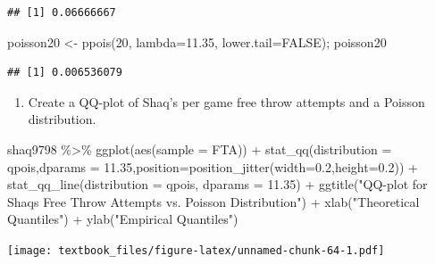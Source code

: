 \documentclass[
  11pt,
]{book}
\newenvironment{Shaded}{\begin{snugshade}}{\end{snugshade}}
\newcommand{\AttributeTok}[1]{\textcolor[rgb]{0.77,0.63,0.00}{#1}}
\newcommand{\ConstantTok}[1]{\textcolor[rgb]{0.00,0.00,0.00}{#1}}
\newcommand{\DecValTok}[1]{\textcolor[rgb]{0.00,0.00,0.81}{#1}}
\newcommand{\FloatTok}[1]{\textcolor[rgb]{0.00,0.00,0.81}{#1}}
\newcommand{\FunctionTok}[1]{\textcolor[rgb]{0.00,0.00,0.00}{#1}}
\newcommand{\NormalTok}[1]{#1}
\newcommand{\OtherTok}[1]{\textcolor[rgb]{0.56,0.35,0.01}{#1}}
\newcommand{\SpecialCharTok}[1]{\textcolor[rgb]{0.00,0.00,0.00}{#1}}
\newcommand{\StringTok}[1]{\textcolor[rgb]{0.31,0.60,0.02}{#1}}
\providecommand{\tightlist}{%
  \setlength{\itemsep}{0pt}\setlength{\parskip}{0pt}}
\theoremstyle{definition}
\theoremstyle{definition}
\theoremstyle{definition}
\theoremstyle{definition}
\theoremstyle{remark}
\begin{document}
\begin{verbatim}
## [1] 0.06666667
\end{verbatim}

\begin{Shaded}
\begin{Highlighting}[]
\NormalTok{poisson20 }\OtherTok{\textless{}{-}} \FunctionTok{ppois}\NormalTok{(}\DecValTok{20}\NormalTok{, }\AttributeTok{lambda=}\FloatTok{11.35}\NormalTok{, }\AttributeTok{lower.tail=}\ConstantTok{FALSE}\NormalTok{); poisson20}
\end{Highlighting}
\end{Shaded}

\begin{verbatim}
## [1] 0.006536079
\end{verbatim}

\newpage

\begin{enumerate}
\def\labelenumi{(\alph{enumi})}
\setcounter{enumi}{5}
\tightlist
\item
  Create a QQ-plot of Shaq's per game free throw attempts and a Poisson distribution.
\end{enumerate}

\begin{Shaded}
\begin{Highlighting}[]
\NormalTok{shaq9798 }\SpecialCharTok{\%\textgreater{}\%} 
  \FunctionTok{ggplot}\NormalTok{(}\FunctionTok{aes}\NormalTok{(}\AttributeTok{sample =}\NormalTok{ FTA)) }\SpecialCharTok{+}
  \FunctionTok{stat\_qq}\NormalTok{(}\AttributeTok{distribution =}\NormalTok{ qpois,}\AttributeTok{dparams =} \FloatTok{11.35}\NormalTok{,}\AttributeTok{position=}\FunctionTok{position\_jitter}\NormalTok{(}\AttributeTok{width=}\FloatTok{0.2}\NormalTok{,}\AttributeTok{height=}\FloatTok{0.2}\NormalTok{)) }\SpecialCharTok{+}
  \FunctionTok{stat\_qq\_line}\NormalTok{(}\AttributeTok{distribution =}\NormalTok{ qpois, }\AttributeTok{dparams =} \FloatTok{11.35}\NormalTok{) }\SpecialCharTok{+}
  \FunctionTok{ggtitle}\NormalTok{(}\StringTok{"QQ{-}plot for Shaq\textquotesingle{}s Free Throw Attempts vs. Poisson Distribution"}\NormalTok{) }\SpecialCharTok{+}
  \FunctionTok{xlab}\NormalTok{(}\StringTok{"Theoretical Quantiles"}\NormalTok{) }\SpecialCharTok{+}
  \FunctionTok{ylab}\NormalTok{(}\StringTok{"Empirical Quantiles"}\NormalTok{)}
\end{Highlighting}
\end{Shaded}

\texttt{[image: textbook\_files/figure-latex/unnamed-chunk-64-1.pdf]}
\end{document}
